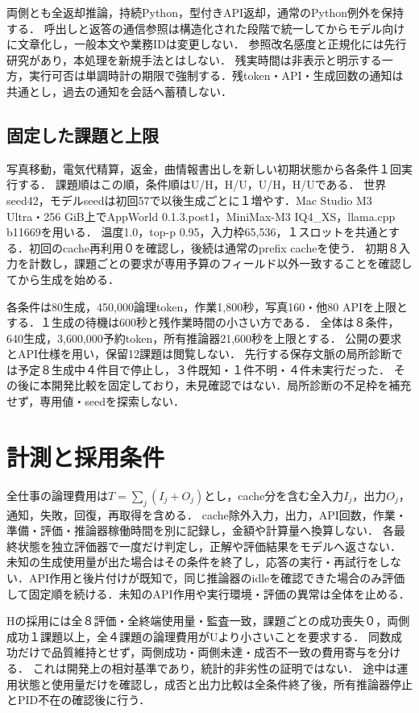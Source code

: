 \documentclass[uplatex,a4paper,twocolumn,10pt]{jsarticle}
\begin{document}
両側とも全返却推論，持続Python，型付きAPI返却，通常のPython例外を保持する．
呼出しと返答の通信参照は構造化された段階で統一してからモデル向けに文章化し，一般本文や業務IDは変更しない．
参照改名感度と正規化には先行研究\cite{canonical}があり，本処理を新規手法とはしない．
残実時間は非表示と明示する一方，実行可否は単調時計の期限で強制する．残token・API・生成回数の通知は共通とし，過去の通知を会話へ蓄積しない．

\subsection{固定した課題と上限}
写真移動，電気代精算，返金，曲情報書出しを新しい初期状態から各条件１回実行する．
課題順はこの順，条件順はU/H，H/U，U/H，H/Uである．
世界seed42，モデルseedは初回57で以後生成ごとに１増やす．Mac Studio M3 Ultra・256 GiB上でAppWorld 0.1.3.post1，MiniMax-M3 IQ4\_XS，llama.cpp b11669を用いる．
温度1.0，top-p 0.95，入力枠65,536，１スロットを共通とする．初回のcache再利用０を確認し，後続は通常のprefix cacheを使う．
初期８入力を計数し，課題ごとの要求が専用予算のフィールド以外一致することを確認してから生成を始める．

各条件は80生成，450,000論理token，作業1,800秒，写真160・他80 APIを上限とする．１生成の待機は600秒と残作業時間の小さい方である．
全体は８条件，640生成，3,600,000予約token，所有推論器21,600秒を上限とする．
公開の要求とAPI仕様を用い，保留12課題は閲覧しない．
先行する保存文脈の局所診断では予定８生成中４件目で停止し，３件既知・１件不明・４件未実行だった．
その後に本開発比較を固定しており，未見確認ではない．局所診断の不足枠を補充せず，専用値・seedを探索しない．

\section{計測と採用条件}
全仕事の論理費用は$T=\sum_j(I_j+O_j)$とし，cache分を含む全入力$I_j$，出力$O_j$，通知，失敗，回復，再取得を含める．
cache除外入力，出力，API回数，作業・準備・評価・推論器稼働時間を別に記録し，金額や計算量へ換算しない．
各最終状態を独立評価器で一度だけ判定し，正解や評価結果をモデルへ返さない．
未知の生成使用量が出た場合はその条件を終了し，応答の実行・再試行をしない．API作用と後片付けが既知で，同じ推論器のidleを確認できた場合のみ評価して固定順を続ける．未知のAPI作用や実行環境・評価の異常は全体を止める．

Hの採用には全８評価・全終端使用量・監査一致，課題ごとの成功喪失０，両側成功１課題以上，全４課題の論理費用がUより小さいことを要求する．
同数成功だけで品質維持とせず，両側成功・両側未達・成否不一致の費用寄与を分ける．
これは開発上の相対基準であり，統計的非劣性の証明ではない．
途中は運用状態と使用量だけを確認し，成否と出力比較は全条件終了後，所有推論器停止とPID不在の確認後に行う．
\end{document}
